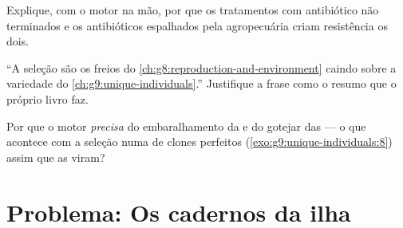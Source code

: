 \begin{exercise}[$\star\star$]\label{exo:g9:how-species-change:10}
Explique, com o motor na mão, por que os tratamentos com
antibiótico não terminados e os antibióticos espalhados pela
agropecuária criam resistência os dois.
\end{exercise}

\begin{exercise}[$\star\star$]\label{exo:g9:how-species-change:11}
``A seleção são os freios do
\cref{ch:g8:reproduction-and-environment} caindo sobre a
variedade do \cref{ch:g9:unique-individuals}.'' Justifique a
frase como o resumo que o próprio livro faz.
\end{exercise}

\begin{exercise}[$\star\star\star$]\label{exo:g9:how-species-change:12}
Por que o motor \emph{precisa} do embaralhamento da
 e do gotejar das  --- o que
acontece com a seleção numa  de clones perfeitos
(\cref{exo:g9:unique-individuals:8}) assim que as 
viram?
\end{exercise}

\section{Problema: Os cadernos da ilha}

